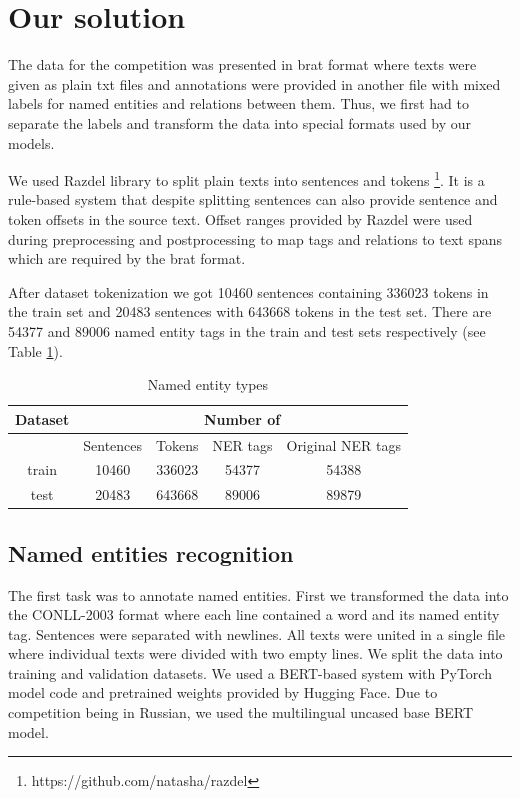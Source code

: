 \documentclass{dialogue}
\begin{document}
\section{Our solution}
The data for the competition was presented in brat format \cite{brat} where texts were given as plain txt files and annotations were provided in another file with mixed labels for named entities and relations between them. Thus, we first had to separate the labels and transform the data into special formats used by our models.

We used Razdel library to split plain texts into sentences and tokens \footnote{https://github.com/natasha/razdel}. It is a rule-based system that despite splitting sentences can also provide sentence and token offsets in the source text. Offset ranges provided by Razdel were used during preprocessing and postprocessing to map tags and relations to text spans which are required by the brat format.

After dataset tokenization we got 10460 sentences containing 336023 tokens in the train set and 20483 sentences with 643668 tokens in the test set. There are 54377 and 89006 named entity tags in the train and test sets respectively (see Table \ref{tab:tokenization}).

\begin{table}[bth]
	\centering
	\begin{tabular}{c|c|c|c|c}
		\hline
		\multicolumn{1}{c|}{Dataset} &
		\multicolumn{4}{c}{Number of} \\  \hline
		& Sentences& Tokens & NER tags & Original NER tags\\ \hline
	train & 10460 & 336023 & 54377 & 54388\\ \hline
	test & 20483 & 643668 & 89006 & 89879\\ \hline
	\end{tabular}
	\caption{Named entity types}
	\label{tab:tokenization}
\end{table}

\subsection{Named entities recognition}
The first task was to annotate named entities. First we transformed the data into the CONLL-2003 format where each line contained a word and its named entity tag. Sentences were separated with newlines. All texts were united in a single file where individual texts were divided with two empty lines. We split the data into training and validation datasets. We used a BERT-based system \cite{bert} with PyTorch model code and pretrained weights provided by Hugging Face. Due to competition being in Russian, we used the multilingual uncased base BERT model.
\end{document}
